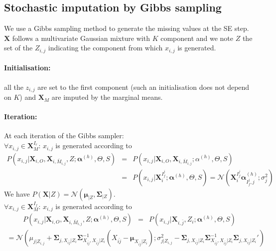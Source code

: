 \documentclass[12pt,a4paper]{report}
\begin{document}
	\subsection{Stochastic imputation by Gibbs sampling}
		We use a Gibbs sampling method to generate the missing values at the SE step. $\boldsymbol{X}$ follows a multivariate Gaussian mixture with $K$ component and we note $Z$ the set of the $Z_{i,j}$ indicating the component from which $x_{i,j}$ is generated.
		\paragraph{Initialisation:} all the $z_{i,j}$ are set to the first component (such an initialisation does not depend on $K$) and $\boldsymbol{X}_M$ are imputed by the marginal means.
		\paragraph{Iteration:} At each iteration of the Gibbs sampler: \\
			$\forall x_{i,j} \in \boldsymbol{X}_M^{I_r}$:  $x_{i,j}$ is generated according to 
			\begin{eqnarray}
			P(x_{i,j}|\boldsymbol{X}_{i,O},\boldsymbol{X}_{i,\bar{M}_{i,j}},Z;\boldsymbol{\alpha}^{(h)},\Theta,S)&=&P(x_{i,j}|\boldsymbol{X}_{i,O},\boldsymbol{X}_{i,\bar{M}_{i,j}};\alpha^{(h)},\Theta,S) \\
			&=&P(x_{i,j}|\boldsymbol{X}_i^{I_f^j};\boldsymbol{\alpha}^{(h)},\Theta,S)=\mathcal{N}(\boldsymbol{X}_i^{I_f^j}\boldsymbol{\alpha}^{(h)}_{I_f^j,j};\sigma_j^2 )
			\end{eqnarray}		
			We have $P(\boldsymbol{X}|Z)=\mathcal{N}(\boldsymbol{\mu}_{|Z},\boldsymbol{\Sigma}_{|Z})$. \\
			$\forall x_{i,j} \in \boldsymbol{X}_M^{I_f}$:  $x_{i,j}$ is generated according to 
			\begin{eqnarray}
			P(x_{i,j}|\boldsymbol{X}_{i,O},\boldsymbol{X}_{i,\bar{M}_{i,j}},Z;\boldsymbol{\alpha}^{(h)},\Theta,S)&=&P(x_{i,j}|\boldsymbol{X}_{i,\bar{j}},Z_i;\boldsymbol{\alpha}^{(h)},\Theta,S)			\end{eqnarray}			
			\begin{eqnarray}
			=\mathcal{N}(\mu_{j|Z_{i,j}} + \boldsymbol{\Sigma}_{j,X_{\bar{ij}}|Z_i}\boldsymbol{\Sigma}^{-1}_{X_{\bar{ij}},X_{\bar{ij}}|Z_i}(X_{\bar{ij}}-\boldsymbol{\mu}_{X_{\bar{ij}}|Z_i}) ;  \sigma_{j|Z_{i,j}}^2-\boldsymbol{\Sigma}_{j,X_{\bar{ij}}|Z_i}\boldsymbol{\Sigma}^{-1}_{X_{\bar{ij}},X_{\bar{ij}}|Z_i}\boldsymbol{\Sigma}_{j,X_{\bar{ij}}|Z_i}')
			\end{eqnarray}		
\end{document}
